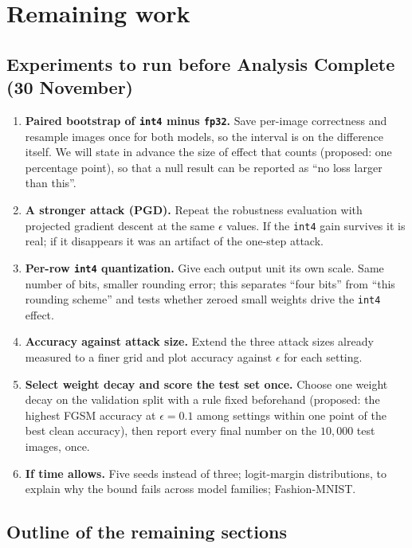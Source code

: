 \documentclass{article}
\newcommand{\fp}{\texttt{fp32}}
\newcommand{\ifour}{\texttt{int4}}
\begin{document}
\section{Remaining work}
\label{sec:remaining}

\subsection{Experiments to run before Analysis Complete (30 November)}

\begin{enumerate}
  \item \textbf{Paired bootstrap of \ifour{} minus \fp{}.} Save per-image correctness and resample images once for both models, so the interval is on the difference itself. We will state in advance the size of effect that counts (proposed: one percentage point), so that a null result can be reported as ``no loss larger than this''.
  \item \textbf{A stronger attack (PGD).} Repeat the robustness evaluation with projected gradient descent \citep{madry2018towards} at the same $\epsilon$ values. If the \ifour{} gain survives it is real; if it disappears it was an artifact of the one-step attack.
  \item \textbf{Per-row \ifour{} quantization.} Give each output unit its own scale. Same number of bits, smaller rounding error; this separates ``four bits'' from ``this rounding scheme'' and tests whether zeroed small weights drive the \ifour{} effect.
  \item \textbf{Accuracy against attack size.} Extend the three attack sizes already measured to a finer grid and plot accuracy against $\epsilon$ for each setting.
  \item \textbf{Select weight decay and score the test set once.} Choose one weight decay on the validation split with a rule fixed beforehand (proposed: the highest FGSM accuracy at $\epsilon = 0.1$ among settings within one point of the best clean accuracy), then report every final number on the $10{,}000$ test images, once.
  \item \textbf{If time allows.} Five seeds instead of three; logit-margin distributions, to explain why the bound fails across model families; Fashion-MNIST.
\end{enumerate}

\subsection{Outline of the remaining sections}
\end{document}
